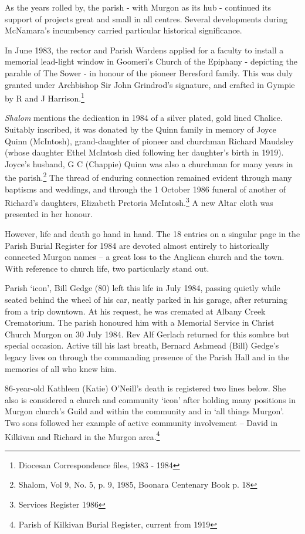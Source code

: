 As the years rolled by, the parish - with Murgon as its hub - continued its support of projects great and small in all centres. Several developments during McNamara's incumbency carried particular historical significance.



In June 1983, the rector and Parish Wardens applied for a faculty to install a memorial lead-light window in Goomeri's Church of the Epiphany - depicting the parable of The Sower - in honour of the pioneer Beresford family. This was duly granted under Archbishop Sir John Grindrod's signature, and crafted in Gympie by R and J Harrison.\footnote{Diocesan Correspondence files, 1983 - 1984}


\emph{Shalom} mentions the dedication in 1984 of a silver plated, gold lined Chalice. Suitably inscribed, it was donated by the Quinn family in memory of Joyce Quinn (McIntosh), grand-daughter of pioneer and churchman Richard Maudsley (whose daughter Ethel McIntosh died following her daughter's birth in 1919). Joyce's husband, G C (Chappie) Quinn was also a churchman for many years in the parish.\footnote{Shalom, Vol 9, No. 5, p. 9, 1985, Boonara Centenary Book p. 18} The thread of enduring connection remained evident through many baptisms and weddings, and through the 1 October 1986 funeral of another of Richard's daughters, Elizabeth Pretoria McIntosh.\footnote{Services Register 1986} A new Altar cloth was presented in her honour.


However, life and death go hand in hand. The 18 entries on a singular page in the Parish Burial Register for 1984 are devoted almost entirely to historically connected Murgon names -- a great loss to the Anglican church and the town. With reference to church life, two particularly stand out.



Parish `icon', Bill Gedge (80) left this life in July 1984, passing quietly while seated behind the wheel of his car, neatly parked in his garage, after returning from a trip downtown. At his request, he was cremated at Albany Creek Crematorium. The parish honoured him with a Memorial Service in Christ Church Murgon on 30 July 1984. Rev Alf Gerlach returned for this sombre but special occasion. Active till his last breath, Bernard Ashmead (Bill) Gedge's legacy lives on through the commanding presence of the Parish Hall and in the memories of all who knew him.



86-year-old Kathleen (Katie) O'Neill's death is registered two lines below. She also is considered a church and community `icon' after holding many positions in Murgon church's Guild and within the community and in `all things Murgon'. Two sons followed her example of active community involvement -- David in Kilkivan and Richard in the Murgon area.\footnote{Parish of Kilkivan Burial Register, current from 1919}


